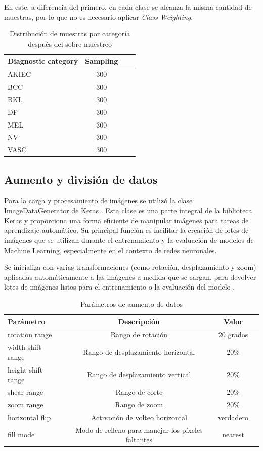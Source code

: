En este, a diferencia del primero, en cada clase se alcanza la misma cantidad de muestras, por lo que no es necesario aplicar \textit{Class Weighting}.

\begin{table}[ht]
   \centering
   \begin{tabular}{lccc}
   \hline
   Diagnostic category & Sampling  \\ \hline
   AKIEC & 300 \\
   BCC & 300 \\
   BKL & 300 \\
   DF & 300 \\
   MEL & 300 \\
   NV & 300 \\
   VASC & 300 \\ \hline
   \end{tabular}
   \caption{Distribución de muestras por categoría después del sobre-muestreo}
   \label{tab:sampling_distribution}
   \end{table}

\subsection{Aumento y división de datos}

Para la carga y procesamiento de imágenes se utilizó la clase ImageDataGenerator de Keras . Esta clase es una parte integral de la biblioteca Keras y proporciona una forma eficiente de manipular imágenes para tareas de aprendizaje automático. Su principal función es facilitar la creación de lotes de imágenes que se utilizan durante el entrenamiento y la evaluación de modelos de Machine Learning, especialmente en el contexto de redes neuronales. 

Se inicializa con varias transformaciones (como rotación, desplazamiento y zoom) aplicadas automáticamente a las imágenes a medida que se cargan, para devolver lotes de imágenes listos para el entrenamiento o la evaluación del modelo .

\begin{table}[ht]
   \centering
   \begin{tabular}{lccc}
   \hline
   Parámetro & Descripción  & Valor \\ \hline
   rotation range & 	Rango de rotación & 20 grados \\
   width shift range & Rango de desplazamiento horizontal & 20\% \\
   height shift range & Rango de desplazamiento vertical & 20\% \\
   shear range & 	Rango de corte & 20\% \\
   zoom range & Rango de zoom & 20\% \\
   horizontal flip & Activación de volteo horizontal & verdadero \\
   fill mode & Modo de relleno para manejar los píxeles faltantes & nearest \\ \hline
   \end{tabular}
   \caption{Parámetros de aumento de datos}
   \label{tab:data_augmentation_params}
   \end{table}

